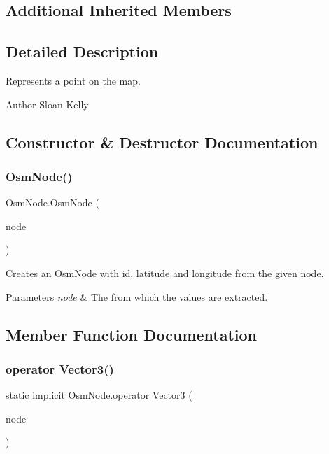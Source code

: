 \subsection*{Additional Inherited Members}


\subsection{Detailed Description}
Represents a point on the map. 

\begin{DoxyAuthor}{Author}
Sloan Kelly
\end{DoxyAuthor}


\subsection{Constructor \& Destructor Documentation}
\mbox{\label{class_osm_node_a16217f3d8ba19dc3bab1da4e5b4e7a3a}} 
\subsubsection{\texorpdfstring{OsmNode()}{OsmNode()}}
{\footnotesize\ttfamily Osm\+Node.\+Osm\+Node (\begin{DoxyParamCaption}\item[{Xml\+Node}]{node }\end{DoxyParamCaption})}



Creates an \mbox{\hyperlink{class_osm_node}{Osm\+Node}} with id, latitude and longitude from the given node. 


\begin{DoxyParams}{Parameters}
{\em node} & The from which the values are extracted.\\
\hline
\end{DoxyParams}


\subsection{Member Function Documentation}
\mbox{\label{class_osm_node_a5745eaf8dbc5fc470a77d83c3f74d308}} 
\subsubsection{\texorpdfstring{operator Vector3()}{operator Vector3()}}
{\footnotesize\ttfamily static implicit Osm\+Node.\+operator Vector3 (\begin{DoxyParamCaption}\item[{\mbox{\hyperlink{class_osm_node}{Osm\+Node}}}]{node }\end{DoxyParamCaption})\hspace{0.3cm}{\ttfamily [static]}}



